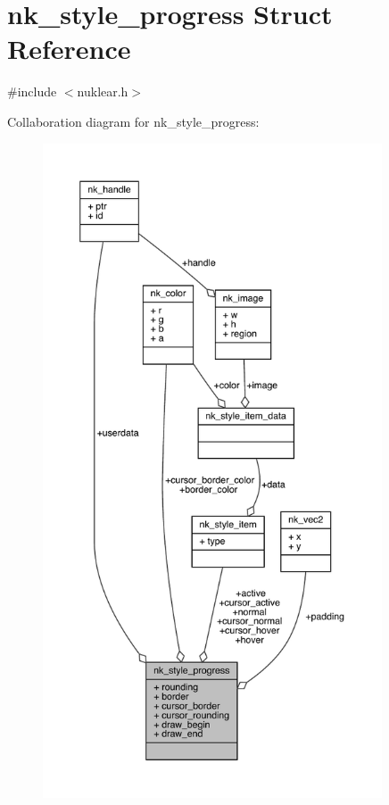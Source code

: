 \hypertarget{structnk__style__progress}{}\section{nk\+\_\+style\+\_\+progress Struct Reference}
\label{structnk__style__progress}


{\ttfamily \#include $<$nuklear.\+h$>$}



Collaboration diagram for nk\+\_\+style\+\_\+progress\+:
\nopagebreak
\begin{figure}[H]
\begin{center}
\leavevmode
\includegraphics[height=550pt]{structnk__style__progress__coll__graph}
\end{center}
\end{figure}
